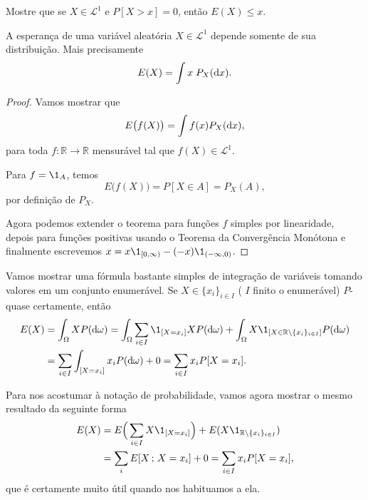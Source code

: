 \begin{exercise}
  Mostre que se $X \in \mathcal{L}^1$ e $P[X > x] = 0$, então $E(X) \leq x$.
\end{exercise}

\begin{lemma}
  A esperança de uma variável aleatória $X \in \mathcal{L}^1$ depende somente de sua distribuição.
  Mais precisamente
  \begin{equation}
    E(X) = \int x \; P_X (\mathop{}\!\mathrm{d} x).
  \end{equation}
\end{lemma}

\begin{proof}
  Vamos mostrar que
  \begin{equation}
    E\big(f(X)\big) = \int f(x) P_X (\mathop{}\!\mathrm{d} x),
  \end{equation}
  para toda $f: \mathbb{R} \to \mathbb{R}$ mensurável tal que $f(X) \in \mathcal{L}^1$.

  Para $f = \1_A$, temos
  \begin{equation}
    E\big(f(X)\big) = P[X \in A] =  P_X (A),
  \end{equation}
  por definição de $P_X$.

  Agora podemos extender o teorema para funções $f$ simples por linearidade,
  depois para funções positivas usando o Teorema da Convergência Monótona e
  finalmente escrevemos $x = x \1_{[0, \infty)} - (-x) \1_{(-\infty,0)}$.
\end{proof}

Vamos mostrar uma fórmula bastante simples de integração de variáveis tomando valores em um conjunto enumerável.
Se $X \in \{x_i\}_{i\in I}$ ( $I$ finito o enumerável) $P$-quase certamente, então
\begin{equation}
  \begin{split}
    E(X) & = \int_\Omega X P(\d \omega) = \int_{\Omega} \sum_{i\in I} \1_{[X = x_i]} X P(\d \omega) +
    \int_{\gO} X \1_{[X\in\bbR \setminus \{x_i\}_{i\in I}]}  P(\d \omega)\\
    & = \sum_{i\in I} \int_{[X = x_i]} x_i P(\d \omega) + 0 = \sum_{i\in I} x_i P[X = x_i].
  \end{split}
\end{equation}

Para nos acostumar à notação de probabilidade, vamos agora mostrar o mesmo resultado da seguinte forma
\begin{equation}
  \begin{split}
    E(X) & = E\Big(\sum_{i\in I} X \1_{[X = x_i]}\Big) + E(X \1_{\bbR \setminus \{x_i\}_{i\in I}})\\
    & = \sum_i E[X\, ; \, X = x_i] + 0 = \sum_{i\in I} x_i P[X = x_i],
  \end{split}
\end{equation}
que é certamente muito útil quando nos habituamos a ela.

